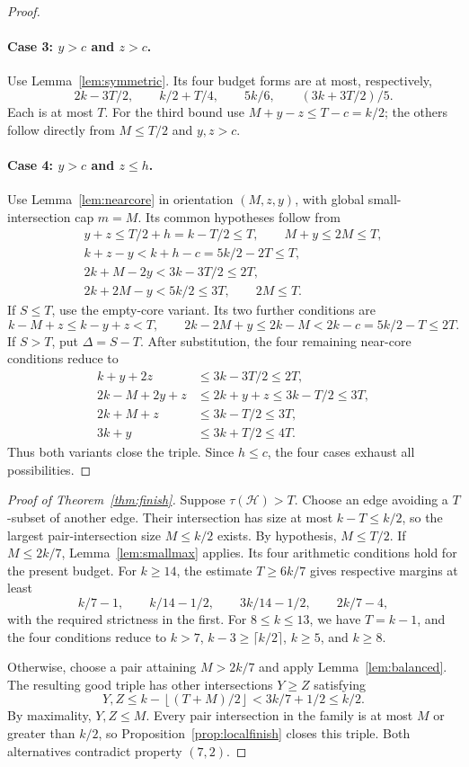 \documentclass[11pt]{article}
\numberwithin{equation}{section}
\theoremstyle{definition}
\theoremstyle{remark}
\newcommand{\HH}{\mathcal H}
\newcommand{\floor}[1]{\left\lfloor #1\right\rfloor}
\begin{document}
\begin{proof}
\paragraph{Case 3: $y>c$ and $z>c$.}
Use Lemma~\ref{lem:symmetric}. Its four budget forms are at most,
respectively,
\[
 2k-3T/2,\qquad k/2+T/4,\qquad5k/6,\qquad
 (3k+3T/2)/5.
\]
Each is at most $T$. For the third bound use
$M+y-z\le T-c=k/2$; the others follow directly from $M\le T/2$
and $y,z>c$.

\paragraph{Case 4: $y>c$ and $z\le h$.}
Use Lemma~\ref{lem:nearcore} in orientation $(M,z,y)$, with global
small-intersection cap $m=M$. Its common hypotheses follow from
\begin{gather*}
 y+z\le T/2+h=k-T/2\le T,\qquad M+y\le2M\le T,\\
 k+z-y<k+h-c=5k/2-2T\le T,\\
 2k+M-2y<3k-3T/2\le2T,\\
 2k+2M-y<5k/2\le3T,\qquad2M\le T.
\end{gather*}
If $S\le T$, use the empty-core variant. Its two further conditions are
\[
 k-M+z\le k-y+z<T,\qquad
 2k-2M+y\le2k-M<2k-c=5k/2-T\le2T.
\]
If $S>T$, put $\Delta=S-T$. After substitution, the four remaining
near-core conditions reduce to
\begin{align*}
 k+y+2z&\le3k-3T/2\le2T,\\
 2k-M+2y+z&\le2k+y+z\le3k-T/2\le3T,\\
 2k+M+z&\le3k-T/2\le3T,\\
 3k+y&\le3k+T/2\le4T.
\end{align*}
Thus both variants close the triple. Since $h\le c$, the four cases
exhaust all possibilities.
\end{proof}

\begin{proof}[Proof of Theorem~\ref{thm:finish}]
Suppose $\tau(\HH)>T$. Choose an edge avoiding a $T$-subset of another
edge. Their intersection has size at most $k-T\le k/2$, so the largest
pair-intersection size $M\le k/2$ exists. By hypothesis, $M\le T/2$.
If $M\le2k/7$, Lemma~\ref{lem:smallmax} applies.
Its four arithmetic conditions hold for the present budget.
For $k\ge14$, the estimate $T\ge6k/7$ gives respective margins at least
\[
 k/7-1,\qquad k/14-1/2,\qquad3k/14-1/2,\qquad2k/7-4,
\]
with the required strictness in the first. For $8\le k\le13$, we have
$T=k-1$, and the four conditions reduce to
$k>7$, $k-3\ge\lceil k/2\rceil$, $k\ge5$, and $k\ge8$.

Otherwise, choose a pair attaining $M>2k/7$ and apply
Lemma~\ref{lem:balanced}. The resulting good triple has other
intersections $Y\ge Z$ satisfying
\[
 Y,Z\le k-\floor{(T+M)/2}<3k/7+1/2\le k/2.
\]
By maximality, $Y,Z\le M$. Every pair intersection in the family is
at most $M$ or greater than $k/2$, so Proposition~\ref{prop:localfinish}
closes this triple. Both alternatives contradict property $(7,2)$.
\end{proof}
\end{document}
